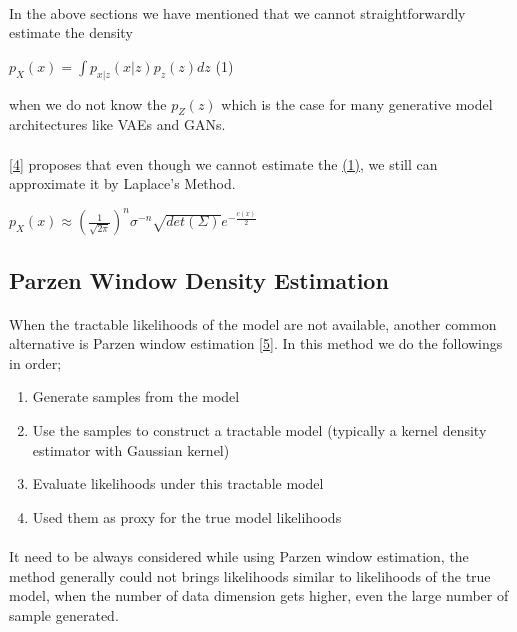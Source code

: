 \documentclass{article}
\begin{document}
    \paragraph{}
    In the above sections we have mentioned that we cannot straightforwardly estimate the density 
    \begin{center}
        \hspace{3cm} $p_X(x) = \int p_{x|z}(x|z)p_z(z)dz$   \label{sec: eq1} \hspace{3cm} (1)
    \end{center}
     when we do not know the $p_Z(z)$ which is the case for many generative model architectures like VAEs and GANs.
    \paragraph{}
    \hyperref[sec: ref4]{[4]} proposes that even though we cannot estimate the \hyperref[sec: eq1]{(1)}, we still can approximate it by Laplace's Method.
    \begin{center}
        $p_X(x) \approx (\frac{1}{\sqrt{2\pi}})^n \sigma^{-n} \sqrt{det(\Sigma)} e^{-\frac{c(x)}{2}}$
    \end{center}
    
    \subsection{Parzen Window Density Estimation}
    \paragraph{}
    When the tractable likelihoods of the model are not available, another common alternative is Parzen window estimation \hyperref[sec: ref5]{[5]}.
    In this method we do the followings in order;
    \begin{enumerate}
        \item Generate samples from the model
        \item Use the samples to construct a tractable model (typically a kernel density estimator with Gaussian kernel)
        \item Evaluate likelihoods under this tractable model
        \item Used them as proxy for the true model likelihoods
    \end{enumerate}
    \paragraph{}
    It need to be always considered while using Parzen window estimation, the method generally could not brings likelihoods similar to likelihoods of the true model, when the number of data dimension gets higher, even the large number of sample generated.
\end{document}
